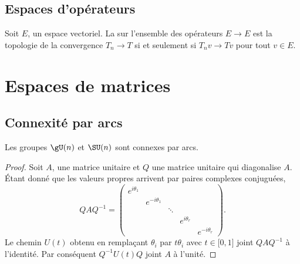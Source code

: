 \subsection{Espaces d'opérateurs}

Soit \( E\), un espace vectoriel. La  sur l'ensemble des opérateurs \( E\to E\) est la topologie de la convergence \( T_n\to T\) si et seulement si \( T_nv\to Tv\) pour tout \( v\in E\).



\section{Espaces de matrices}

\subsection{Connexité par arcs}

\begin{lemma}
    Les groupes \( \gU(n)\) et \( \SU(n)\) sont connexes par arcs.
\end{lemma}

\begin{proof}
    Soit \( A\), une matrice unitaire et \( Q\) une matrice unitaire qui diagonalise \( A\). Étant donné que les valeurs propres arrivent par paires complexes conjuguées,
    \begin{equation}
        QAQ^{-1}=\begin{pmatrix}
            e^{i\theta_1}    &       &       &       &   \\  
            &    e^{-i\theta_1}    &       &       &   \\  
            &       &    \ddots    &       &   \\  
            &       &       &    e^{i\theta_r}    &   \\  
            &       &       &       &        e^{-i\theta_r}
        \end{pmatrix}.
    \end{equation}
    Le chemin \( U(t)\) obtenu en remplaçant \( \theta_i\) par \( t\theta_i\) avec \( t\in\mathopen[ 0 , 1 \mathclose]\) joint \( QAQ^{-1}\) à l'identité. Par conséquent \( Q^{-1}U(t)Q\) joint \( A\) à l'unité.
\end{proof}

